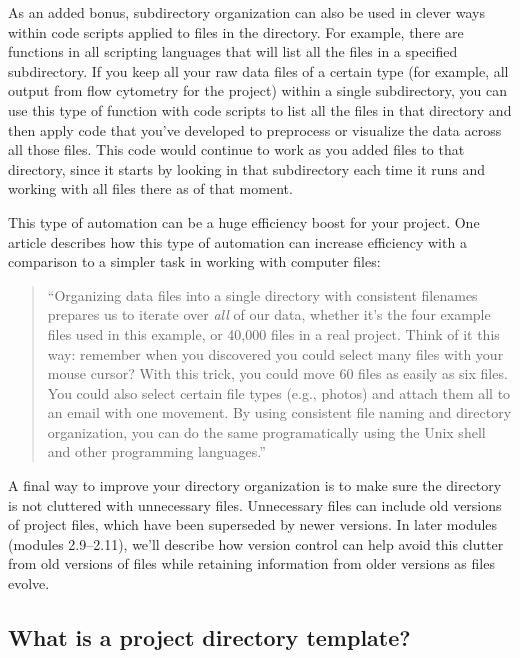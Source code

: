 \documentclass[]{tufte-book}
\begin{document}
As an added bonus, subdirectory organization can also be used in clever ways
within code scripts applied to files in the directory. For example, there are
functions in all scripting languages that will list all the files in a specified
subdirectory. If you keep all your raw data files of a certain type (for
example, all output from flow cytometry for the project) within a single
subdirectory, you can use this type of function with code scripts to list all
the files in that directory and then apply code that you've developed to
preprocess or visualize the data across all those files. This code would
continue to work as you added files to that directory, since it starts by
looking in that subdirectory each time it runs and working with all files there
as of that moment.

This type of automation can be a huge efficiency boost for your project.
One article describes how this type of automation can increase efficiency
with a comparison to a simpler task in working with computer files:

\begin{quote}
``Organizing data files into a single directory with consistent filenames
prepares us to iterate over \emph{all} of our data, whether it's the four example
files used in this example, or 40,000 files in a real project. Think of it this
way: remember when you discovered you could select many files with your mouse
cursor? With this trick, you could move 60 files as easily as six files. You
could also select certain file types (e.g., photos) and attach them all to an
email with one movement. By using consistent file naming and directory
organization, you can do the same programatically using the Unix shell and other
programming languages.'' \citep{buffalo2015bioinformatics}
\end{quote}

A final way to improve your directory organization is to make sure the directory
is not cluttered with unnecessary files. Unnecessary files can include old versions
of project files, which have been superseded by newer versions. In later modules
(modules 2.9--2.11), we'll describe how version control can help avoid this clutter
from old versions of files while retaining information from older versions as
files evolve.

\subsection{What is a project directory template?}\label{what-is-a-project-directory-template}
\end{document}
